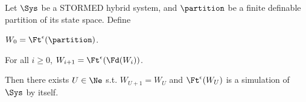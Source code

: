 %
%


\begin{thm}
	\label{thm:finite simulation}
	Let $\Sys$ be a STORMED hybrid system, 
	and $\partition$ be a finite definable partition of its state space.
	Define 
	\begin{compactitem}
		\item $W_0 = \Ft^\epsilon(\partition)$.
		\item For all $i\geq 0$, $W_{i+1} = \Ft^\epsilon(\Fd(W_i))$.
	\end{compactitem}
Then there exists $U \in \Ne$ s.t. $W_{U+1} = W_U$ and $\Ft^\epsilon(W_U)$ is a simulation of $\Sys$ by itself.
\end{thm}

